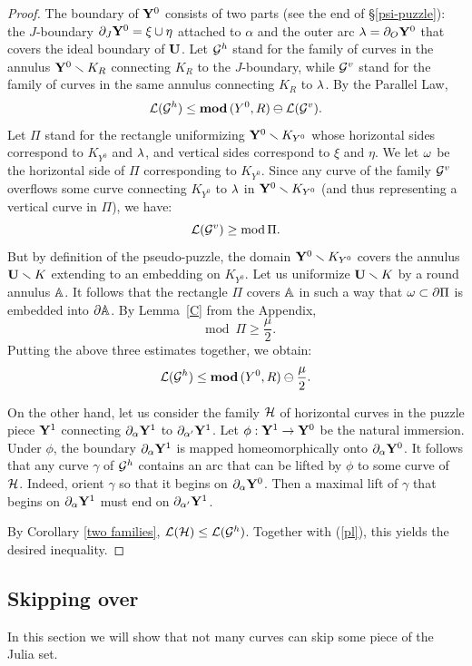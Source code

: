 \begin{proof}
  The boundary of ${\mathbf{Y}}^0$ consists of two parts (see the end of \S \ref{psi-puzzle}):
the $J$-boundary $\partial_J{\mathbf{Y}}^0 = \xi\cup\eta$ attached to $\alpha$ and the outer  arc ${\lambda}=\partial_O{\mathbf{Y}}^0$
that covers the ideal boundary of ${\mathbf{U}}$.
Let ${\mathcal G}^h$ stand for the family of curves in the annulus ${\mathbf{Y}}^0\smallsetminus K_R$  connecting $K_R$ to the $J$-boundary,
while ${\mathcal G}^v$ stand for the family of curves in the same annulus  connecting $K_R$ to ${\lambda}$.
By the Parallel Law,
$$
   {\mathcal L}({\mathcal G}^h) \leq { \mathbf{mod}\, } (Y^0, R) \ominus {\mathcal L}({\mathcal G}^v).
$$
Let $\Pi$ stand for the rectangle uniformizing  ${\mathbf{Y}}^0\smallsetminus K_{Y^0}$ whose horizontal sides
correspond to  $K_{Y^0}$ and ${\lambda}$,
and vertical sides correspond to $\xi$ and $\eta$.
We let ${\omega}$ be the horizontal side of $\Pi$ corresponding to $K_{Y^0}$.
Since any curve of the family ${\mathcal G}^v$
overflows some curve connecting $K_{Y^0}$ to ${\lambda}$ in ${\mathbf{Y}}^0\smallsetminus K_{Y^0}$
(and thus representing a vertical curve in $\Pi$), we have:
$$
{\mathcal L} ({\mathcal G}^v) \geq \operatorname{mod} \Pi.
$$
But by definition of the pseudo-puzzle,
the domain ${\mathbf{Y}}^0\smallsetminus K_{Y^0}$  covers the annulus ${\mathbf{U}}\smallsetminus K$
extending to an embedding on $K_{Y^0}$. Let us uniformize ${\mathbf{U}}\smallsetminus K$ by a
round annulus ${\Bbb A}$. It follows that the rectangle $\Pi$ covers ${\Bbb A}$ in such a way that
${\omega}\subset \partial\Pi $ is embedded into $\partial {\Bbb A}$.
By Lemma~\ref{C} from the Appendix,
$$
   \mod \Pi \geq \frac{\mu}{2}.
$$
Putting the above three estimates together, we obtain:
\begin{equation}\label{pl}
  {\mathcal L}({\mathcal G}^h) \leq { \mathbf{mod}\, } (Y^0, R) \ominus \frac{\mu}{2}.
\end{equation}

On the other hand,
let us consider the family ${\mathcal H}$ of horizontal curves in the puzzle piece ${\mathbf{Y}}^1$
connecting $\partial_\alpha{\mathbf{Y}}^1$ to $\partial_{\alpha'} {\mathbf{Y}}^1$.
Let $\phi: {\mathbf{Y}}^1\rightarrow {\mathbf{Y}}^0$ be the natural immersion.
Under $\phi$,
the boundary $\partial_\alpha {\mathbf{Y}}^1$ is mapped homeomorphically onto $\partial_\alpha {\mathbf{Y}}^0$.
It follows that any curve $\gamma$ of ${\mathcal G}^h$ contains an arc
that can be lifted by $\phi$ to some curve of ${\mathcal H}$.
Indeed, orient $\gamma$ so that it begins on $\partial_\alpha{\mathbf{Y}}^0$.
Then a maximal lift of $\gamma$ that begins on $\partial_\alpha{\mathbf{Y}}^1$
must end on $\partial_{\alpha'} {\mathbf{Y}}^1$.

By Corollary \ref{two families}, $ {\mathcal L}({\mathcal H})\leq {\mathcal L}({\mathcal G}^h)$.
Together with (\ref{pl}), this yields the desired inequality.
\end{proof}

\subsection{Skipping over}
  In this section we will show that not many curves can skip some piece of the Julia set.


